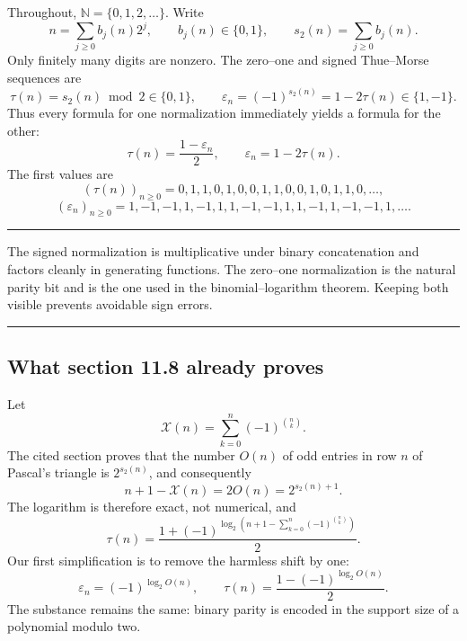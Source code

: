 \documentclass[11pt,oneside]{article}
\theoremstyle{definition}
\theoremstyle{remark}
\newcommand{\N}{\mathbb N}
\newcommand{\swt}{s_2}
\newcommand{\eps}{\varepsilon}
\newcommand{\1}{\mathbf 1}
\newenvironment{boxedremark}{%
  \par\smallskip\noindent\begin{center}\begin{minipage}{0.94\textwidth}%
  \color{black}\hrule\vspace{0.6em}\small
}{%
  \vspace{0.6em}\hrule\end{minipage}\end{center}\smallskip
}
\begin{document}
Throughout, \(\N=\{0,1,2,\ldots\}\).  Write
\[
 n=\sum_{j\ge 0} b_j(n)2^j,
 \qquad b_j(n)\in\{0,1\},
 \qquad \swt(n)=\sum_{j\ge0}b_j(n).
\]
Only finitely many digits are nonzero.  The zero--one and signed Thue--Morse sequences are
\begin{equation}
 \tau(n)=\swt(n)\bmod2\in\{0,1\},
 \qquad
 \eps_n=(-1)^{\swt(n)}=1-2\tau(n)\in\{1,-1\}.
 \label{eq:normalizations}
\end{equation}
Thus every formula for one normalization immediately yields a formula for the other:
\begin{equation}
 \tau(n)=\frac{1-\eps_n}{2},
 \qquad
 \eps_n=1-2\tau(n).
 \label{eq:conversion}
\end{equation}
The first values are
\[
 (\tau(n))_{n\ge0}=0,1,1,0,1,0,0,1,1,0,0,1,0,1,1,0,\ldots,
\]
\[
 (\eps_n)_{n\ge0}=1,-1,-1,1,-1,1,1,-1,-1,1,1,-1,1,-1,-1,1,\ldots.
\]

\begin{boxedremark}
The signed normalization is multiplicative under binary concatenation and factors cleanly in
generating functions.  The zero--one normalization is the natural parity bit and is the one
used in the binomial--logarithm theorem.  Keeping both visible prevents avoidable sign errors.
\end{boxedremark}

\subsection{What section 11.8 already proves}

Let
\begin{equation}
 \mathcal X(n)=\sum_{k=0}^{n}(-1)^{\binom nk}.
 \label{eq:source-X}
\end{equation}
The cited section proves that the number \(O(n)\) of odd entries in row \(n\) of Pascal's
triangle is \(2^{\swt(n)}\), and consequently
\begin{equation}
 n+1-\mathcal X(n)=2O(n)=2^{\swt(n)+1}.
 \label{eq:source-exact-power}
\end{equation}
The logarithm is therefore exact, not numerical, and
\begin{equation}
 \tau(n)
 =\frac{1+(-1)^{\log_2\!\left(n+1-\sum_{k=0}^{n}(-1)^{\binom nk}\right)}}{2}.
 \label{eq:source-formula}
\end{equation}
Our first simplification is to remove the harmless shift by one:
\begin{equation}
 \boxed{
 \eps_n=(-1)^{\log_2 O(n)},
 \qquad
 \tau(n)=\frac{1-(-1)^{\log_2 O(n)}}2.}
 \label{eq:pascal-count-direct}
\end{equation}
The substance remains the same: binary parity is encoded in the support size of a polynomial
modulo two.
\end{document}
